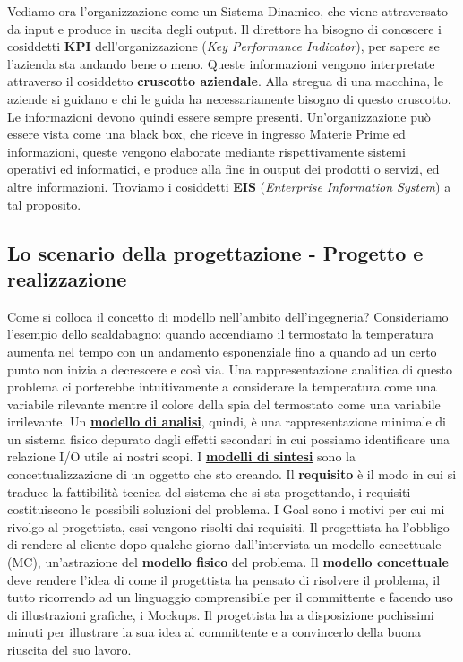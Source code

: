 Vediamo ora l'organizzazione come un Sistema Dinamico, che viene attraversato da input e produce in uscita degli output. Il direttore ha bisogno di conoscere i cosiddetti \textbf{KPI} dell'organizzazione (\textit{Key Performance Indicator}), per sapere se l'azienda sta andando bene o meno. Queste informazioni vengono interpretate attraverso il cosiddetto \textbf{cruscotto aziendale}. Alla stregua di una macchina, le aziende si guidano e chi le guida ha necessariamente bisogno di questo cruscotto. Le informazioni devono quindi essere sempre presenti. Un’organizzazione può essere vista come una black box, che riceve in ingresso Materie Prime ed informazioni, queste vengono elaborate mediante rispettivamente sistemi operativi ed informatici, e produce alla fine in output dei prodotti o servizi, ed altre informazioni. Troviamo i cosiddetti \textbf{EIS} (\textit{Enterprise Information System}) a tal proposito. 


\subsection{Lo scenario della progettazione - Progetto e realizzazione}

Come si colloca il concetto di modello nell’ambito dell’ingegneria? Consideriamo l’esempio dello scaldabagno: quando accendiamo il termostato la temperatura aumenta nel tempo con un andamento esponenziale fino a quando ad un certo punto non inizia a decrescere e così via. Una rappresentazione analitica di questo problema ci porterebbe intuitivamente a considerare la temperatura come una variabile rilevante mentre il colore della spia del termostato come una variabile irrilevante. Un \underline{\textbf{modello di analisi}}, quindi, è una rappresentazione minimale di un sistema fisico depurato dagli effetti secondari in cui possiamo identificare una relazione I/O utile ai nostri scopi. I \underline{\textbf{modelli di sintesi}} sono la concettualizzazione di un oggetto che sto creando.  Il \textbf{requisito} è il modo in cui si traduce la fattibilità tecnica del sistema che si sta progettando, i requisiti costituiscono le possibili soluzioni del problema. I Goal sono i motivi per cui mi rivolgo al progettista, essi vengono risolti dai requisiti. Il progettista ha l’obbligo di rendere al cliente dopo qualche giorno dall’intervista un modello concettuale (MC), un’astrazione del \textbf{modello fisico} del problema. Il \textbf{modello concettuale} deve rendere l’idea di come il progettista ha pensato di risolvere il problema, il tutto ricorrendo ad un linguaggio comprensibile per il committente e facendo uso di illustrazioni grafiche, i Mockups. Il progettista ha a disposizione pochissimi minuti per illustrare la sua idea al committente e a convincerlo della buona riuscita del suo lavoro. 
 
